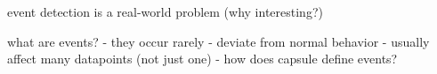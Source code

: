 




















\PP event detection is a real-world problem (why interesting?)

\PP what are events?
- they occur rarely
- deviate from normal behavior
- usually affect many datapoints (not just one)
- how does capsule define events?

